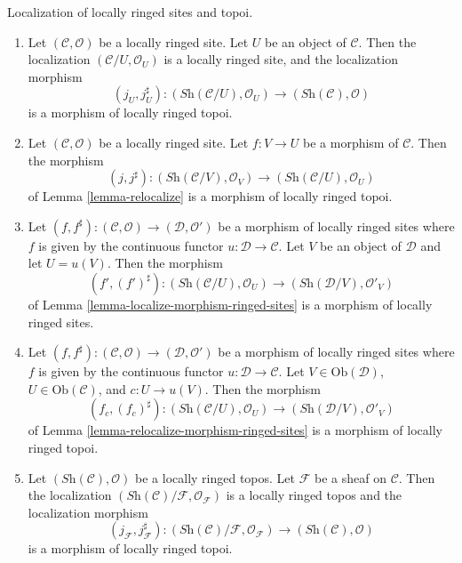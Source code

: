 \begin{lemma}
\label{lemma-localize-morphism-locally-ringed-topoi}
Localization of locally ringed sites and topoi.
\begin{enumerate}
\item Let $(\mathcal{C}, \mathcal{O})$ be a locally ringed site.
Let $U$ be an object of $\mathcal{C}$. Then the localization
$(\mathcal{C}/U, \mathcal{O}_U)$ is a locally ringed site, and
the localization morphism
$$
(j_U, j_U^\sharp) :
(\textit{Sh}(\mathcal{C}/U), \mathcal{O}_U)
\to
(\textit{Sh}(\mathcal{C}), \mathcal{O})
$$
is a morphism of locally ringed topoi.
\item Let $(\mathcal{C}, \mathcal{O})$ be a locally ringed site.
Let $f : V \to U$ be a morphism of $\mathcal{C}$.
Then the morphism
$$
(j, j^\sharp) : 
(\textit{Sh}(\mathcal{C}/V), \mathcal{O}_V)
\to
(\textit{Sh}(\mathcal{C}/U), \mathcal{O}_U)
$$
of
Lemma \ref{lemma-relocalize}
is a morphism of locally ringed topoi.
\item Let 
$(f, f^\sharp) :
(\mathcal{C}, \mathcal{O})
\longrightarrow
(\mathcal{D}, \mathcal{O}')$
be a morphism of locally ringed sites where $f$ is given by the continuous
functor $u : \mathcal{D} \to \mathcal{C}$. Let $V$ be an object of
$\mathcal{D}$ and let $U = u(V)$. Then the morphism
$$
(f', (f')^\sharp) :
(\textit{Sh}(\mathcal{C}/U), \mathcal{O}_U)
\to
(\textit{Sh}(\mathcal{D}/V), \mathcal{O}'_V)
$$
of
Lemma \ref{lemma-localize-morphism-ringed-sites}
is a morphism of locally ringed sites.
\item Let 
$(f, f^\sharp) :
(\mathcal{C}, \mathcal{O})
\longrightarrow
(\mathcal{D}, \mathcal{O}')$
be a morphism of locally ringed sites where $f$ is given by the continuous
functor $u : \mathcal{D} \to \mathcal{C}$. Let $V \in \text{Ob}(\mathcal{D})$,
$U \in \text{Ob}(\mathcal{C})$, and $c : U \to u(V)$. Then the morphism
$$
(f_c, (f_c)^\sharp) :
(\textit{Sh}(\mathcal{C}/U), \mathcal{O}_U)
\to
(\textit{Sh}(\mathcal{D}/V), \mathcal{O}'_V)
$$
of
Lemma \ref{lemma-relocalize-morphism-ringed-sites}
is a morphism of locally ringed topoi.
\item Let $(\textit{Sh}(\mathcal{C}), \mathcal{O})$ be a locally
ringed topos. Let $\mathcal{F}$ be a sheaf on $\mathcal{C}$.
Then the localization
$(\textit{Sh}(\mathcal{C})/\mathcal{F}, \mathcal{O}_{\mathcal{F}})$
is a locally ringed topos and the localization morphism
$$
(j_{\mathcal{F}}, j_{\mathcal{F}}^\sharp) :
(\textit{Sh}(\mathcal{C})/\mathcal{F}, \mathcal{O}_{\mathcal{F}})
\to
(\textit{Sh}(\mathcal{C}), \mathcal{O})
$$
is a morphism of locally ringed topoi.

\end{enumerate}
\end{lemma}
